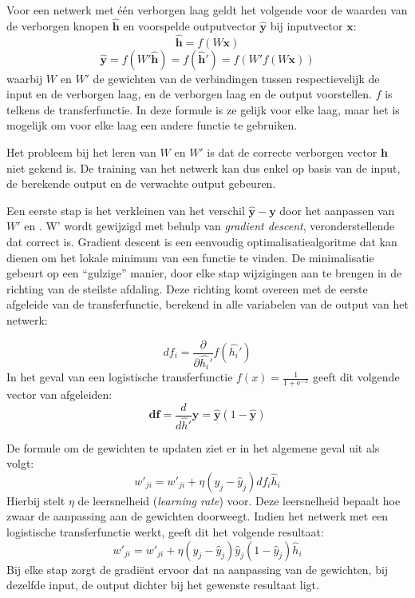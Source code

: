 Voor een netwerk met \'e\'en verborgen laag geldt het volgende voor de waarden van de verborgen knopen $\mathbf{\hat{h}}$ en voorspelde outputvector $\mathbf{\hat{y}}$ bij inputvector $\mathbf{x}$:
\begin{equation}
    \mathbf{\hat{h}} = f(W\mathbf{x})
\end{equation}
\begin{equation}
    \boldsymbol{\hat{y}} = f(W'\mathbf{\hat{h}}) = f(\boldsymbol{\hat{h}'}) = f(W'f(W\boldsymbol{x}))
\end{equation}
waarbij ${W}$ en ${W'}$ de gewichten van de verbindingen tussen respectievelijk de input en de verborgen laag, en de verborgen laag en de output voorstellen. $f$ is telkens de transferfunctie. In deze formule is ze gelijk voor elke laag, maar het is mogelijk om voor elke laag een andere functie te gebruiken.

Het probleem bij het leren van ${W}$ en ${W'}$ is dat de correcte verborgen vector $\mathbf{h}$ niet gekend is. De training van het netwerk kan dus enkel op basis van de input, de  berekende output en de verwachte output gebeuren.

Een eerste stap is het verkleinen van het verschil $\mathbf{\hat{y}} - \mathbf{y}$ door het aanpassen van $W'$ en . {W'} wordt gewijzigd met behulp van \emph{gradient descent}, veronderstellende dat  correct is. Gradient descent is een eenvoudig optimalisatiealgoritme dat kan dienen om het lokale minimum van een functie te vinden. De minimalisatie gebeurt op een ``gulzige'' manier, door elke stap wijzigingen aan te brengen in de richting van de steilste afdaling. Deze richting komt overeen met de eerste afgeleide van de transferfunctie, berekend in alle variabelen van de output van het netwerk:

\begin{equation}
df_i = \frac{\partial}{\partial\hat{h_i}'}f(\hat{h_i}')
\end{equation}
In het geval van een logistische transferfunctie $f(x) = \frac{1}{1 + \mathrm e^{-x}}$ geeft dit volgende vector van afgeleiden:
\begin{equation}
  \mathbf{df} = \frac{d}{d\hat{h}'}\mathbf{\hat{y}} = \mathbf{\hat{y}}(1-\mathbf{\hat{y}})
\end{equation}

De formule om de gewichten te updaten ziet er in het algemene geval uit als volgt:
\begin{equation}
  w'_{ji} = w'_{ji} + \eta(y_j-\hat{y}_j)df_i\hat{h}_i
\end{equation}
Hierbij stelt $\eta$ de leersnelheid (\emph{learning rate}) voor. Deze leersnelheid bepaalt hoe zwaar de aanpassing aan de gewichten doorweegt.
Indien het netwerk met een logistische transferfunctie werkt, geeft dit het volgende resultaat:
\begin{equation}
    w'_{ji} = w'_{ji} + \eta(y_j-\hat{y}_j)\hat{y}_j(1-\hat{y}_j)\hat{h}_i
\end{equation}
Bij elke stap zorgt de gradi\"ent ervoor dat na aanpassing van de gewichten, bij dezelfde input, de output dichter bij het gewenste resultaat ligt.


